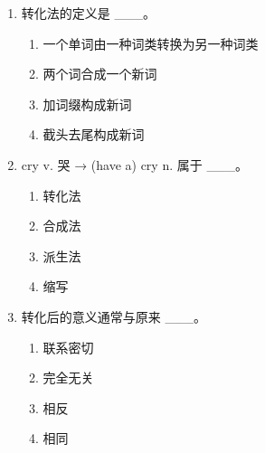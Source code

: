 \documentclass[11pt,a4paper]{ctexart}
\begin{document}
\begin{enumerate}[leftmargin=*,itemsep=4pt]
\begin{enumerate}[label=\Alph*.,leftmargin=2em,itemsep=1pt,topsep=2pt]
\item 缩写
\end{enumerate}
\item 转化法的定义是 \_\_\_。
\begin{enumerate}[label=\Alph*.,leftmargin=2em,itemsep=1pt,topsep=2pt]
\item 一个单词由一种词类转换为另一种词类
\item 两个词合成一个新词
\item 加词缀构成新词
\item 截头去尾构成新词
\end{enumerate}
\item cry v. 哭 → (have a) cry n. 属于 \_\_\_。
\begin{enumerate}[label=\Alph*.,leftmargin=2em,itemsep=1pt,topsep=2pt]
\item 转化法
\item 合成法
\item 派生法
\item 缩写
\end{enumerate}
\item 转化后的意义通常与原来 \_\_\_。
\begin{enumerate}[label=\Alph*.,leftmargin=2em,itemsep=1pt,topsep=2pt]
\item 联系密切
\item 完全无关
\item 相反
\item 相同
\end{enumerate}
\end{enumerate}
\end{document}
